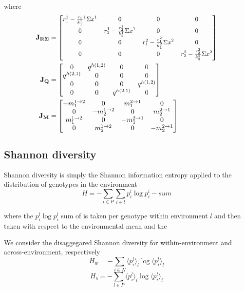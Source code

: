 \documentclass[12pt]{article}
\begin{document}
where
\begin{align*}
\mathbf{J_{R\Sigma}} &= \small{\begin{bmatrix}
    r_1^1 - \frac{r_1}{k_1^1}^1\Sigma x^1 & 0 & 0 & 0 \\ 
        0 & r_2^1 - \frac{r_2^1}{k_2^1} \Sigma x^1 & 0 & 0 \\
    0 & 0 & r_1^2 - \frac{r_1^2}{k_1^2}\Sigma x^2 & 0 \\
    0 & 0 & 0 & r_2^2 - \frac{r_2^2}{k_2^2} \Sigma x^2  \\       
\end{bmatrix}} \\
 \mathbf{J_Q} &= \begin{bmatrix}
    0 & q^{h(1,2)} & 0 & 0 \\ 
    q^{h(2,1)} & 0 & 0 & 0 \\
    0 & 0 & 0 & q^{h(1,2)} \\
    0 & 0 & q^{h(2,1)} & 0 \\       
\end{bmatrix} \\
 \mathbf{J_M} &= \begin{bmatrix}
    -m_1^{1\rightarrow 2} & 0 & m_1^{2\rightarrow 1} & 0 \\ 
    0 & -m_2^{1\rightarrow 2}& 0 & m_2^{2\rightarrow 1} \\
    m_1^{1\rightarrow 2} & 0 & -m_1^{2\rightarrow 1} & 0 \\
    0 & m_2^{1\rightarrow 2} & 0 & -m_2^{2\rightarrow 1} \\       
\end{bmatrix} 
\end{align*}

\subsection*{Shannon diversity}
Shannon diversity is simply the Shannon information entropy applied to the distribution of genotypes in the environment
\[ H = -\sum_{l \in P} \sum_{i \in l} p^l_i \log p^l_i  -  sum \]

where the $p_i^l \log p_i^l$ sum of is taken per genotype within environment $l$ and then taken with respect to the environmental mean and the 

We consider the disaggegared Shannon diversity for within-environment and across-environment, respectively
\[ H_w = -\sum_{i\in N} \langle p_i^l\rangle_l \log \langle p_i^l \rangle_l \]
\[ H_b = -\sum_{l\in P} \langle p_i^l\rangle_i \log \langle p_i^l \rangle_i \]
\end{document}
